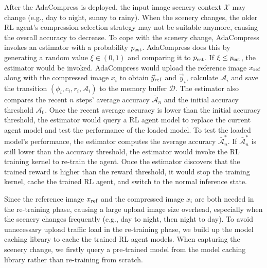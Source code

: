 After the AdaCompress is deployed, the input image scenery context $ \mathcal{X} $ may change (e.g., day to night, sunny to rainy). When the scenery changes, the older RL agent's compression selection strategy may not be suitable anymore, causing the overall accuracy to decrease. To cope with the scenery change, AdaCompress invokes an estimator with a probability $ p_{\rm est} $. AdaCompress does this by generating a random value $ \xi \in (0,1) $ and comparing it to $ p_{\rm est} $. If $ \xi \leq p_{\rm est} $, the estimator would be invoked. AdaCompress would upload the reference image $ x_{\rm ref} $ along with the compressed image $ x_i $ to obtain $ \vec{y}_{\rm ref} $ and $ \vec{y}_i $, calculate $ \mathcal{A}_i $ and save the transition $ (\phi_i, c_i, r_i, \mathcal{A}_i) $ to the memory buffer $ \mathcal{D} $. The estimator also compares the recent $ n $ steps' average accuracy $ \bar{\mathcal{A}}_n $ and the initial accuracy threshold $ \mathcal{A}_0 $. Once the recent average accuracy is lower than the initial accuracy threshold, the estimator would query a RL agent model to replace the current agent model and test the performance of the loaded model. To test the loaded model's performance, the estimator computes the average accuracy $ \bar{\mathcal{A}}^*_n $. If $ \bar{\mathcal{A}}^*_n $ is still lower than the accuracy threshold, the estimator would invoke the RL training kernel to re-train the agent. Once the estimator discovers that the trained reward is higher than the reward threshold, it would stop the training kernel, cache the trained RL agent, and switch to the normal inference state. 

Since the reference image $ x_{\rm ref} $ and the compressed image $ x_i $ are both needed in the re-training phase, causing a large upload image size overhead, especially when the scenery changes frequently (e.g., day to night, then night to day). To avoid unnecessary upload traffic load in the re-training phase, we build up the model caching library to cache the trained RL agent models. When capturing the scenery change, we firstly query a pre-trained model from the model caching library rather than re-training from scratch. %

